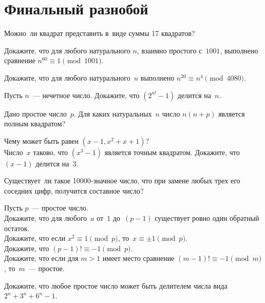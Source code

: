 
\section*{Финальный разнобой}


\begin{problems}

\item
Можно~ли квадрат представить в~виде суммы 17 квадратов?

\item
Докажите, что для любого натурального $n$, взаимно простого с~$1001$,
выполнено сравнение $n^{60} \equiv 1 \pmod{1001}$.

\item
Докажите, что для любого натурального~$n$ выполнено
$n^{20} \equiv n^{4} \pmod{4080}$.

\item
Пусть $n$~--- нечетное число.
Докажите, что $(2^{n!} - 1)$ делится на~$n$.

\item
Дано простое число~$p$.
Для каких натуральных~$n$ число $n (n + p)$ является полным квадратом?

\item
\subproblem
Чему может быть равен $(x - 1, x^2 + x + 1)$?
\\
\subproblem
Число~$x$ таково, что $(x^3 - 1)$ является точным квадратом.
Докажите, что $(x - 1)$ делится на~$3$.

\item
Существует~ли такое 10000-значное число, что при замене любых трех его соседних
цифр, получится составное число?

\item
Пусть $p$~--- простое число.
\\
\subproblem
Докажите, что для любого~$a$ от~$1$ до~$(p - 1)$ существует ровно один
обратный остаток.
\\
\subproblem
Докажите, что если $x^2 \equiv 1 \pmod{p}$, то~$x \equiv \pm 1 \pmod{p}$.
\\
\subproblem{}
Докажите, что $(p - 1)! \equiv -1 \pmod{p}$.
\\
\subproblem
Докажите, что если для $m > 1$ имеет место сравнение
$(m - 1)! \equiv -1 \pmod{m}$, то~$m$~--- простое.

\item
Докажите, что любое простое число может быть делителем числа вида
$2^n + 3^n + 6^n - 1$.

\end{problems}

